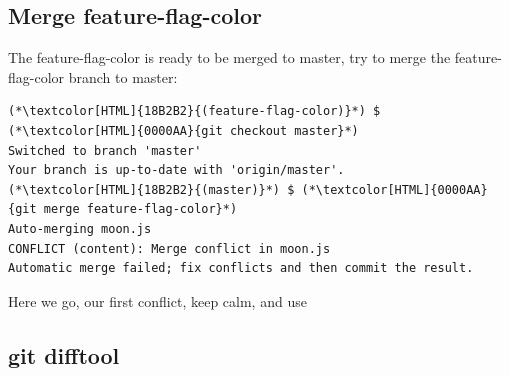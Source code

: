 \subsection{Merge feature-flag-color}
\begin{frame}[fragile]
    \subslidetitle

  The feature-flag-color is ready to be merged to master, try to merge the feature-flag-color branch to master:
\begin{lstlisting}
(*\textcolor[HTML]{18B2B2}{(feature-flag-color)}*) $ (*\textcolor[HTML]{0000AA}{git checkout master}*)
Switched to branch 'master'
Your branch is up-to-date with 'origin/master'.
(*\textcolor[HTML]{18B2B2}{(master)}*) $ (*\textcolor[HTML]{0000AA}{git merge feature-flag-color}*)
Auto-merging moon.js
CONFLICT (content): Merge conflict in moon.js
Automatic merge failed; fix conflicts and then commit the result.
\end{lstlisting}

Here we go, our first conflict, keep calm, and use 

\end{frame}
\begin{frame}[fragile]
    \subslidetitle
\end{frame}

\subsection{git difftool}
\begin{frame}[fragile]
    \subslidetitle
\end{frame}

